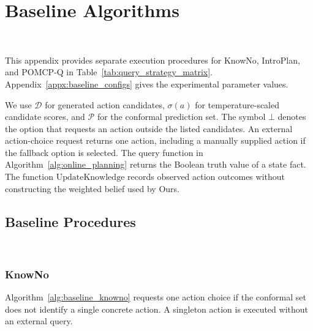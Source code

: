 \section{Baseline Algorithms}~\label{appx:comparison_algorithms}

This appendix provides separate execution procedures for KnowNo, IntroPlan, and POMCP-Q in Table~\ref{tab:query_strategy_matrix}. Appendix~\ref{appx:baseline_configs} gives the experimental parameter values.

We use $\mathcal{D}$ for generated action candidates, $\sigma(a)$ for temperature-scaled candidate scores, and $\mathcal{P}$ for the conformal prediction set. The symbol $\bot$ denotes the option that requests an action outside the listed candidates. An external action-choice request returns one action, including a manually supplied action if the fallback option is selected. The query function in Algorithm~\ref{alg:online_planning} returns the Boolean truth value of a state fact. The function $\mathrm{UpdateKnowledge}$ records observed action outcomes without constructing the weighted belief used by Ours.

\subsection{Baseline Procedures}~\label{appx:baseline_algorithms}

\subsubsection{KnowNo}
Algorithm~\ref{alg:baseline_knowno} requests one action choice if the conformal set does not identify a single concrete action. A singleton action is executed without an external query.

